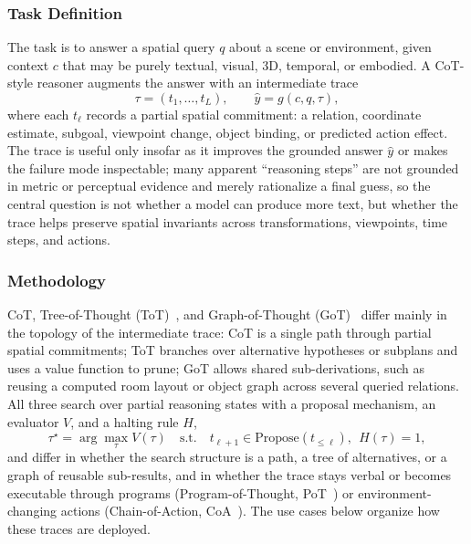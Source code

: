 \subsubsection{Task Definition}
The task is to answer a spatial query $q$ about a scene or environment, given context $c$ that may be purely textual, visual, 3D, temporal, or embodied.
A CoT-style reasoner augments the answer with an intermediate trace
\begin{equation}
    \tau = (t_1,\ldots,t_L), \qquad \hat{y}=g(c,q,\tau),
\end{equation}
where each $t_\ell$ records a partial spatial commitment: a relation, coordinate estimate, subgoal, viewpoint change, object binding, or predicted action effect.
The trace is useful only insofar as it improves the grounded answer $\hat{y}$ or makes the failure mode inspectable; many apparent ``reasoning steps'' are not grounded in metric or perceptual evidence and merely rationalize a final guess, so the central question is not whether a model can produce more text, but whether the trace helps preserve spatial invariants across transformations, viewpoints, time steps, and actions.

\subsubsection{Methodology}
CoT, Tree-of-Thought (ToT)~\cite{yao2023tot}, and Graph-of-Thought (GoT)~\cite{besta2024got} differ mainly in the topology of the intermediate trace: CoT is a single path through partial spatial commitments; ToT branches over alternative hypotheses or subplans and uses a value function to prune; GoT allows shared sub-derivations, such as reusing a computed room layout or object graph across several queried relations.
All three search over partial reasoning states with a proposal mechanism, an evaluator $V$, and a halting rule $H$,
\begin{equation}
    \tau^\star=\arg\max_{\tau} V(\tau)\quad\text{s.t.}\quad t_{\ell+1}\in\mathrm{Propose}(t_{\le \ell}),\ \ H(\tau)=1,
\end{equation}
and differ in whether the search structure is a path, a tree of alternatives, or a graph of reusable sub-results, and in whether the trace stays verbal or becomes executable through programs (Program-of-Thought, PoT~\cite{chen2022pot}) or environment-changing actions (Chain-of-Action, CoA~\cite{pan2024coa}).
The use cases below organize how these traces are deployed.

